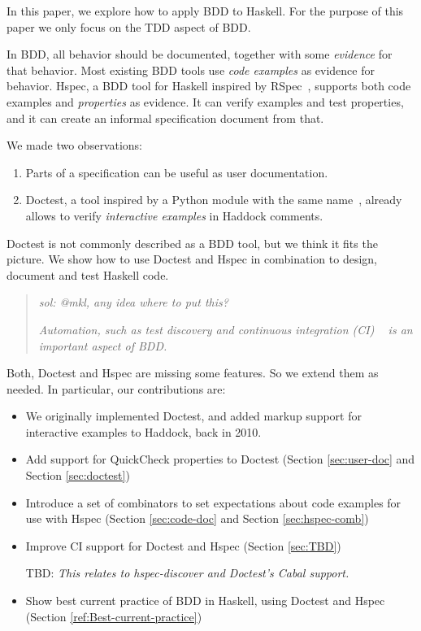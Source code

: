 \documentclass[preprint]{sigplanconf}
\begin{document}
In this paper, we explore how to apply BDD to Haskell.
For the purpose of this paper we only focus on the TDD aspect of BDD.

In BDD, all behavior should be documented, together with some
\emph{evidence} for that behavior.  Most existing BDD tools use
\emph{code examples} as evidence for behavior.
Hspec, a BDD tool for Haskell inspired by RSpec~\cite{rspec}, supports
both code examples and \emph{properties} as evidence.
It can verify examples and test properties, and it can create an
informal specification document from that.

We made two observations:
\begin{enumerate}
    \item
        Parts of a specification can be useful as user documentation.
    \item
        Doctest, a tool inspired by a Python module with the same
        name~\cite{doctest}, already allows to verify
        \emph{interactive examples} in Haddock comments.
\end{enumerate}

\noindent Doctest is not commonly described as a BDD tool, but we
think it fits the picture.
We show how to use Doctest and Hspec in combination to design,
document and test Haskell code.


\begin{quote}
    \emph{sol: @mkl, any idea where to put this?}

\emph{Automation, such as test discovery and continuous integration (CI)
~\cite{ci} is an important aspect of BDD.}
\end{quote}

Both, Doctest and Hspec are missing some features.  So we extend them
as needed.  In particular, our contributions are:

\begin{itemize}
\item
    We originally implemented Doctest, and added markup support for
    interactive examples to Haddock, back in 2010.
\item
    Add support for QuickCheck properties to Doctest (Section
    \ref{sec:user-doc} and Section \ref{sec:doctest})

\item
    Introduce a set of combinators to set expectations about
    code examples for use with Hspec (Section \ref{sec:code-doc} and Section \ref{sec:hspec-comb})

\item
    Improve CI support for Doctest and Hspec (Section \ref{sec:TBD})

    TBD:
    \emph{This relates to hspec-discover and Doctest's Cabal support.}

\item
    Show best current practice of BDD in Haskell, using Doctest and
    Hspec (Section \ref{ref:Best-current-practice})

\end{itemize}
\end{document}
